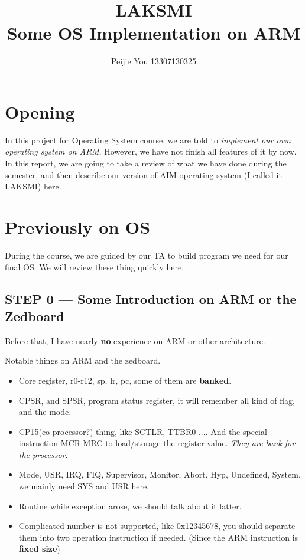 \documentclass[12pt]{article}
\title{LAKSMI\\Some OS Implementation on ARM}
\author{Peijie You 13307130325}
\begin{document}
\maketitle
\tableofcontents
\newpage

\section{Opening}

In this project for Operating System course, we are told to \emph{implement our own operating system on ARM}. However, we have not finish all features of it by now. In this report, we are going to take a review of what we have done during the semester, and then describe our version of AIM operating system (I called it LAKSMI) here.

\section{Previously on OS}

During the course, we are guided by our TA to build program we need for our final OS. We will review these thing quickly here.

\subsection{STEP 0 --- Some Introduction on ARM or the Zedboard}

Before that, I have nearly \textbf{no} experience on ARM or other architecture.

Notable things on ARM and the zedboard.
\begin{itemize}
	\item	Core register, r0-r12, sp, lr, pc, some of them are \textbf{banked}.
	\item CPSR, and SPSR, program status register, it will remember all kind of flag, and the mode.
	\item	CP15(co-processor?) thing, like SCTLR, TTBR0 .... And the special instruction MCR MRC to load/storage the register value. \emph{They are bank for the processor}.
	\item	Mode, USR, IRQ, FIQ, Supervisor, Monitor, Abort, Hyp, Undefined, System, we mainly need SYS and USR here.
	\item	Routine while exception arose, we should talk about it latter.
	\item	Complicated number is not supported, like 0x12345678, you should separate them into two operation instruction if needed. (Since the ARM instruction is \textbf{fixed size})
\end{itemize}
\end{document}
